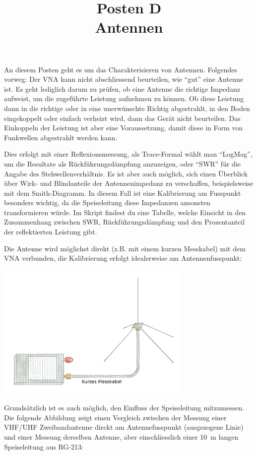 \documentclass[a4paper,11pt,parskip=half,headings=small,DIV=11,notitlepage,abstract=on]{scrartcl}
\title{Posten D\\Antennen}
\author{}
\date{}
\begin{document}
\maketitle
\vspace{-2cm}
An diesem Posten geht es um das Charakterisieren von Antennen. Folgendes
vorweg: Der VNA kann nicht abschliessend beurteilen, wie ``gut'' eine Antenne
ist. Es geht lediglich darum zu prüfen, ob eine Antenne die richtige Impedanz
aufweist, um die zugeführte Leistung aufnehmen zu können. Ob diese Leistung
dann in die richtige oder in eine unerwünschte Richtig abgestrahlt, in den
Boden eingekoppelt oder einfach verheizt wird, dann das Gerät nicht beurteilen.
Das Einkoppeln der Leistung ist aber eine Voraussetzung, damit diese in Form
von Funkwellen abgestrahlt werden kann.

Dies erfolgt mit einer Reflexionsmessung, als Trace-Formal wählt man ``LogMag'', um die
Resultate als Rückführungsdämpfung anzuzeigen, oder ``SWR'' für die Angabe des
Stehwellenverhältnis. Es ist aber auch möglich, sich einen Überblick über Wirk-
und Blindanteile der Antennenimpedanz zu verschaffen, beispielsweise mit dem
Smith-Diagramm. In diesem Fall ist eine Kalibrierung am Fusspunkt besonders wichtig,
da die Speiseleitung diese Impedanzen ansonsten transformieren würde. Im Skript
findest du eine Tabelle, welche Einsicht in den Zusammenhang zwischen SWR,
Rückführungsdämpfung und den Prozentanteil der reflektierten Leistung gibt.

Die Antenne wird möglichst direkt (z.B. mit einem kurzen Messkabel) mit dem
VNA verbunden, die Kalibrierung erfolgt idealerweise am Antennenfusspunkt:

\begin{center}\includegraphics[width=0.7\textwidth]{../skript/figures/illustration_antenna.png}\end{center}

Grundsätzlich ist es auch möglich, den Einfluss der Speiseleitung mitzumessen.
Die folgende Abbildung zeigt einen Vergleich zwischen der Messung einer VHF/UHF
Zweibandantenne direkt am Antennefusspunkt (ausgezogene Linie) und einer Messung
derselben Antenne, aber einschliesslich einer 10~m langen Speiseleitung aus
RG-213:
\end{document}
